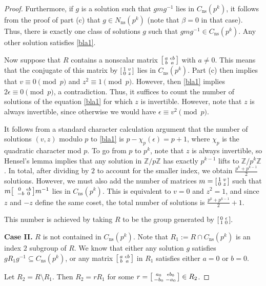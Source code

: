 \documentclass[10pt,leqno]{amsart}
\newcommand\sm[1]{\begin{bsmallmatrix}#1\end{bsmallmatrix}}
\newcommand{\Z}{\mathbb{Z}}
\theoremstyle{definition}
\theoremstyle{remark}
\numberwithin{theorem}{section}
\begin{document}
\begin{proof}
Furthermore, if $g$ is a solution such that $gmg^{-1}$ lies in $C_{\mathrm{ns}}(p^k)$, it follows from the proof of part (c) that $g\in N_{\mathrm{ns}}(p^k)$ (note that $\beta=0$ in that case). Thus, there is exactly one class of solutions $g$ such that $gmg^{-1} \in C_{\mathrm{ns}}(p^k)$. Any other solution satisfies \eqref{bla1}.

Now suppose that $R$ contains a nonscalar matrix $\sm{a & \epsilon b \\b & a}$ with $a\neq 0$. This means that the conjugate of this matrix by $\sm{1 & v \\ 0 & z}$ lies in $C_{\mathrm{ns}}(p^k)$. Part (c) then implies that $v\equiv 0 \pmod p$ and $z^2\equiv 1 \pmod p$. However, then \eqref{bla1} implies $2\epsilon \equiv 0 \pmod p$, a contradiction. Thus, it suffices to count the number of solutions of the equation \eqref{bla1} for which $z$ is invertible. However, note that $z$ is always invertible, since otherwise we would have $\epsilon \equiv v^2 \pmod p$.

It follows from a standard character calculation argument that the number of solutions $(v,z)$ modulo $p$ to  \eqref{bla1} is $p-\chi_p(\epsilon)=p+1$, where $\chi_p$ is the quadratic character mod $p$. To go from $p$ to $p^k$, note that $z$ is always invertible, so Hensel's lemma implies that any solution in $\Z/p\Z$ has exactly $p^{k-1}$ lifts to $\Z/p^k\Z$. In total, after dividing by $2$ to account for the smaller index, we obtain $\frac{p^k+p^{k-1}}{2}$ solutions. However, we must also add the number of matrices $m=\sm{1 & v \\ 0 & z}$ such that $m\sm{0 & \epsilon b \\\ -b & 0}m^{-1}$ lies in $C_{\mathrm{ns}}(p^k)$. This is equivalent to $v=0$ and $z^2=1$, and since $z$ and $-z$ define the same coset, the total number of solutions is $\frac{p^k+p^{k-1}}{2}+1$.

This number is achieved by taking $R$ to be the group generated by $\sm{0 & \epsilon  \\ 1 & 0}.$

\noindent \textbf{Case II.} $R$ is not contained in $C_{\mathrm{ns}}(p^k)$. Note that $R_1:=R\cap C_{\mathrm{ns}}(p^k)$ is an index $2$ subgroup of $R$. We know that either any solution $g$ satisfies $gR_1g^{-1}\subseteq C_{\mathrm{ns}}(p^k)$, or any matrix $\sm{a & \epsilon b \\b & a}$ in $R_1$ satisfies either $a=0$ or $b=0$. 

Let $R_2=R\setminus R_1$. Then $R_2=rR_1$ for some $r=\sm{a_0 & \epsilon b_0 \\ -b_0 & -a_0}\in R_2$.  


\end{proof}
\end{document}
